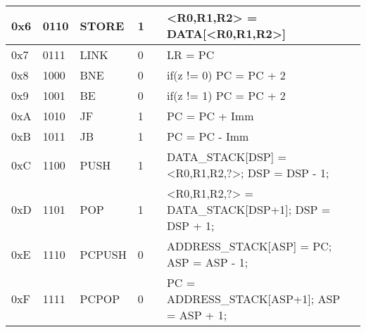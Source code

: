 \documentclass[a4paper]{article}
\begin{document}
\begin{table}[]
\begin{tabular}{|l|l|l|l|l|l|l|}
        0x6                 &   0110            &   STORE               &  1               &                       &   <R0,R1,R2> = DATA[<R0,R1,R2>]           &           \\ \hline
        0x7                 &   0111            &   LINK                &   0           &           &   LR = PC          &           \\ \hline
        0x8                 &   1000            &   BNE                 &  0            &           &   if(z != 0) PC = PC + 2          &           \\ \hline
        0x9                 &   1001            &   BE                  &  0         &           &  if(z != 1) PC = PC + 2         &           \\ \hline
        0xA                 &   1010            &   JF                  &  1         &           &  PC = PC + Imm         &           \\ \hline
        0xB                 &   1011            &   JB                  &  1         &           &  PC = PC - Imm           &           \\ \hline
        0xC                 &   1100            &   PUSH                &  1         &           &  DATA_STACK[DSP] = <R0,R1,R2,?>;      DSP = DSP - 1;          &           \\ \hline
        0xD                 &   1101            &   POP                 &  1         &           &  <R0,R1,R2,?> = DATA_STACK[DSP+1];    DSP = DSP + 1;           &           \\ \hline
        0xE                 &   1110            &   PCPUSH              &  0         &           &  ADDRESS_STACK[ASP] = PC;             ASP = ASP - 1;           &           \\ \hline
        0xF                 &   1111            &   PCPOP               &  0         &           &  PC = ADDRESS_STACK[ASP+1];           ASP = ASP + 1;            &           \\ \hline
    \end{tabular}
\end{table}
\end{document}

